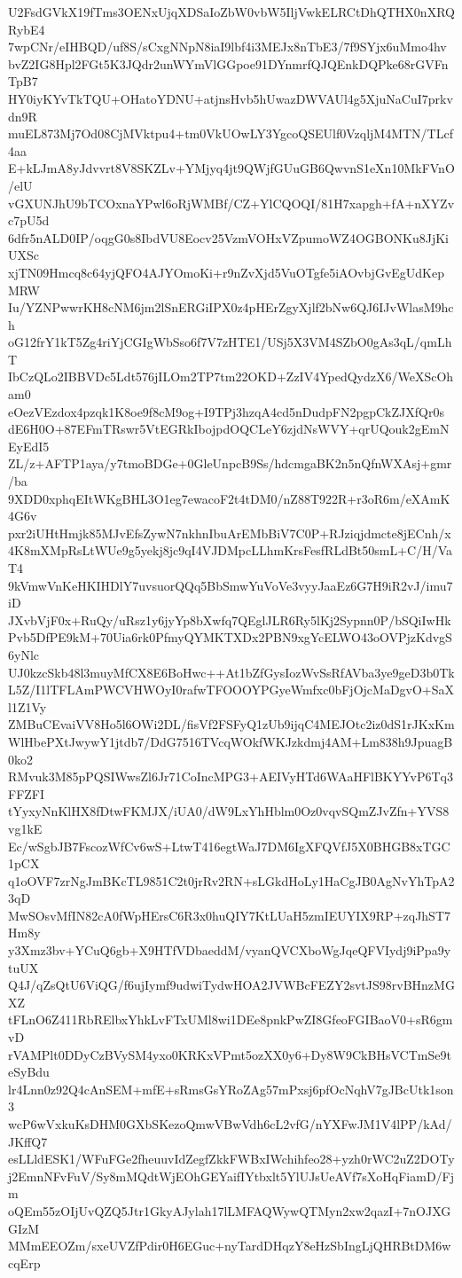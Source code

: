 U2FsdGVkX19fTms3OENxUjqXDSaIoZbW0vbW5IljVwkELRCtDhQTHX0nXRQRybE4
7wpCNr/eIHBQD/uf8S/sCxgNNpN8iaI9lbf4i3MEJx8nTbE3/7f9SYjx6uMmo4hv
bvZ2IG8Hpl2FGt5K3JQdr2unWYmVlGGpoe91DYnmrfQJQEnkDQPke68rGVFnTpB7
HY0iyKYvTkTQU+OHatoYDNU+atjnsHvb5hUwazDWVAUl4g5XjuNaCuI7prkvdn9R
muEL873Mj7Od08CjMVktpu4+tm0VkUOwLY3YgcoQSEUlf0VzqljM4MTN/TLcf4aa
E+kLJmA8yJdvvrt8V8SKZLv+YMjyq4jt9QWjfGUuGB6QwvnS1eXn10MkFVnO/elU
vGXUNJhU9bTCOxnaYPwl6oRjWMBf/CZ+YlCQOQI/81H7xapgh+fA+nXYZvc7pU5d
6dfr5nALD0IP/oqgG0s8IbdVU8Eocv25VzmVOHxVZpumoWZ4OGBONKu8JjKiUXSc
xjTN09Hmcq8c64yjQFO4AJYOmoKi+r9nZvXjd5VuOTgfe5iAOvbjGvEgUdKepMRW
Iu/YZNPwwrKH8cNM6jm2lSnERGiIPX0z4pHErZgyXjlf2bNw6QJ6IJvWlasM9hch
oG12frY1kT5Zg4riYjCGIgWbSso6f7V7zHTE1/USj5X3VM4SZbO0gAs3qL/qmLhT
IbCzQLo2IBBVDc5Ldt576jILOm2TP7tm22OKD+ZzIV4YpedQydzX6/WeXScOham0
eOezVEzdox4pzqk1K8oe9f8cM9og+I9TPj3hzqA4cd5nDudpFN2pgpCkZJXfQr0s
dE6H0O+87EFmTRswr5VtEGRkIbojpdOQCLeY6zjdNsWVY+qrUQouk2gEmNEyEdI5
ZL/z+AFTP1aya/y7tmoBDGe+0GleUnpcB9Ss/hdcmgaBK2n5nQfnWXAsj+gmr/ba
9XDD0xphqEItWKgBHL3O1eg7ewacoF2t4tDM0/nZ88T922R+r3oR6m/eXAmK4G6v
pxr2iUHtHmjk85MJvEfsZywN7nkhnIbuArEMbBiV7C0P+RJziqjdmcte8jECnh/x
4K8mXMpRsLtWUe9g5yekj8jc9qI4VJDMpcLLhmKrsFesfRLdBt50smL+C/H/VaT4
9kVmwVnKeHKIHDlY7uvsuorQQq5BbSmwYuVoVe3vyyJaaEz6G7H9iR2vJ/imu7iD
JXvbVjF0x+RuQy/uRsz1y6jyYp8bXwfq7QEglJLR6Ry5lKj2Sypnn0P/bSQiIwHk
Pvb5DfPE9kM+70Uia6rk0PfmyQYMKTXDx2PBN9xgYcELWO43oOVPjzKdvgS6yNlc
UJ0kzcSkb48l3muyMfCX8E6BoHwc++At1bZfGysIozWvSsRfAVba3ye9geD3b0Tk
L5Z/I1lTFLAmPWCVHWOyI0rafwTFOOOYPGyeWmfxc0bFjOjcMaDgvO+SaXl1Z1Vy
ZMBuCEvaiVV8Ho5l6OWi2DL/fisVf2FSFyQ1zUb9ijqC4MEJOtc2iz0dS1rJKxKm
WlHbePXtJwywY1jtdb7/DdG7516TVcqWOkfWKJzkdmj4AM+Lm838h9JpuagB0ko2
RMvuk3M85pPQSIWwsZl6Jr71CoIncMPG3+AEIVyHTd6WAaHFlBKYYvP6Tq3FFZFI
tYyxyNnKlHX8fDtwFKMJX/iUA0/dW9LxYhHblm0Oz0vqvSQmZJvZfn+YVS8vg1kE
Ec/wSgbJB7FscozWfCv6wS+LtwT416egtWaJ7DM6IgXFQVfJ5X0BHGB8xTGC1pCX
q1oOVF7zrNgJmBKcTL9851C2t0jrRv2RN+sLGkdHoLy1HaCgJB0AgNvYhTpA23qD
MwSOsvMfIN82cA0fWpHErsC6R3x0huQIY7KtLUaH5zmIEUYIX9RP+zqJhST7Hm8y
y3Xmz3bv+YCuQ6gb+X9HTfVDbaeddM/vyanQVCXboWgJqeQFVIydj9iPpa9ytuUX
Q4J/qZsQtU6ViQG/f6ujIymf9udwiTydwHOA2JVWBcFEZY2svtJS98rvBHnzMGXZ
tFLnO6Z411RbRElbxYhkLvFTxUMl8wi1DEe8pnkPwZI8GfeoFGIBaoV0+sR6gmvD
rVAMPlt0DDyCzBVySM4yxo0KRKxVPmt5ozXX0y6+Dy8W9CkBHsVCTmSe9teSyBdu
lr4Lnn0z92Q4cAnSEM+mfE+sRmsGsYRoZAg57mPxsj6pfOcNqhV7gJBcUtk1son3
wcP6wVxkuKsDHM0GXbSKezoQmwVBwVdh6cL2vfG/nYXFwJM1V4lPP/kAd/JKffQ7
esLLldESK1/WFuFGe2fheuuvIdZegfZkkFWBxIWchihfeo28+yzh0rWC2uZ2DOTy
j2EmnNFvFuV/Sy8mMQdtWjEOhGEYaifIYtbxlt5YlUJsUeAVf7sXoHqFiamD/Fjm
oQEm55zOIjUvQZQ5Jtr1GkyAJylah17lLMFAQWywQTMyn2xw2qazI+7nOJXGGIzM
MMmEEOZm/sxeUVZfPdir0H6EGuc+nyTardDHqzY8eHzSbIngLjQHRBtDM6wcqErp
